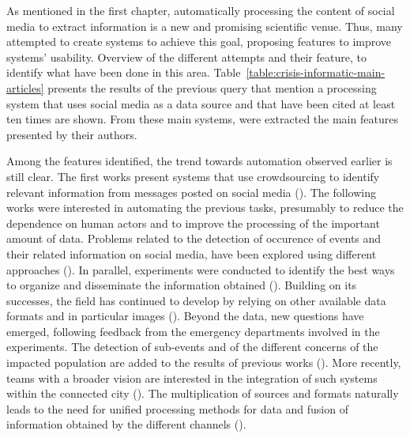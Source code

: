 As mentioned in the first chapter, automatically processing the content of social media to extract information is a new and promising scientific venue.
Thus, many attempted to create systems to achieve this goal, proposing features to improve systems' usability.
Overview of the different attempts and their feature, to identify what have been done in this area.
Table~\ref{table:crisis-informatic-main-articles} presents the results of the previous query that mention a processing system that uses social media as a data source and that have been cited at least ten times are shown.
From these main systems, were extracted the main features presented by their authors.

Among the features identified, the trend towards automation observed earlier is still clear.
The first works present systems that use crowdsourcing to identify relevant information from messages posted on social media
(\cite{schulzCrisisInformationManagement2012a, backfriedOpenSourceIntelligence2012a, imranAIDRArtificialIntelligence2014b}).
The following works were interested in automating the previous tasks, presumably to reduce the dependence on human actors and to improve the processing of the important amount of data.
Problems related to the detection of occurence of events and their related information on social media, have been explored using different approaches (\cite{imranAIDRArtificialIntelligence2014b,middletonRealtimeCrisisMapping2014a,avvenutiEARSEarthquakeAlert2014a, gibsonCombiningBigSocial2014a}).
In parallel, experiments were conducted to identify the best ways to organize and disseminate the information obtained (\cite{middletonRealtimeCrisisMapping2014a,huangDisasterMapperCyberGISFramework2015a,avvenutiPullingInformationSocial2016a,grunder-fahrerTopicsTopicalPhases2018a}).
Building on its successes, the field has continued to develop by relying on other available data formats and in particular images (\cite{alamImage4ActOnlineSocial2017a,nguyenAutomaticImageFiltering2017a,agarwalCrisisDIASMultimodalDamage2020a}).
Beyond the data, new questions have emerged, following feedback from the emergency departments involved in the experiments.
The detection of sub-events and of the different concerns of the impacted population are added to the results of previous works (\cite{wuStreamExplorerMultiStageSystem2018a,raginiBigDataAnalytics2018a,grunder-fahrerTopicsTopicalPhases2018a}).
More recently, teams with a broader vision are interested in the integration of such systems within the connected city (\cite{shahDisasterResilientSmart2019a}).
The multiplication of sources and formats naturally leads to the need for unified processing methods for data and fusion of information obtained by the different channels (\cite{alamDescriptiveVisualSummaries2020a}).

